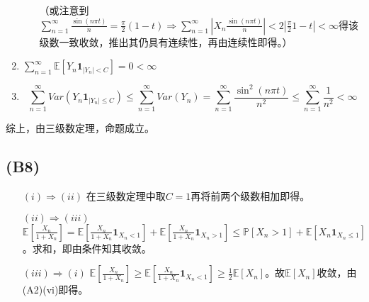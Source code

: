 \documentclass{ctexart}
\begin{document}
\begin{enumerate}
\begin{itemize}
  
  （或注意到$\sum\limits_{n=1}^{\infty}\frac{\sin(n\pi t)}{n}=\frac{\pi}{2}(1-t)\Rightarrow \sum\limits_{n=1}^{\infty}|X_{n}\frac{\sin(n\pi t)}{n}|<2|\frac{\pi}{2}{1-t}|<\infty$得该级数一致收敛，推出其仍具有连续性，再由连续性即得。）
\end{itemize}
\item $\sum_{n=1}^{\infty}\underset{}{\mathbb{E}}\left[ Y_n\mathbf{1}_{|Y_n|<C}\right] =0<\infty$
\item 
\begin{equation*}
\sum\limits_{n=1}^{\infty}Var(Y_n\mathbf{1}_{|Y_n|\leq C})\leq \sum\limits_{n=1}^{\infty}Var(Y_n)=\sum\limits_{n=1}^{\infty}\frac{\sin^2(n\pi t)}{n^2}\leq \sum\limits_{n=1}^{\infty}\frac{1}{n^2}<\infty
\end{equation*}

\end{enumerate}
综上，由三级数定理，命题成立。

\subsection{(B8)}
\begin{enumerate}
\item[$(i)\Rightarrow (ii)$] 在三级数定理中取$C=1$再将前两个级数相加即得。
\item[$(ii)\Rightarrow (iii)$]  $\underset{}{\mathbb{E}}\left[ \frac{X_n}{1+X_n}\right]=\underset{}{\mathbb{E}}\left[ \frac{X_n}{1+X_n}\mathbf{1}_{X_n<1}\right]+\underset{}{\mathbb{E}}\left[ \frac{X_n}{1+X_n}\mathbf{1}_{X_n>1}\right]\leq  \mathbb{P}\left[ X_n>1 \right]+\underset{}{\mathbb{E}}\left[ X_n\mathbf{1}_{X_n\leq 1}\right] $。求和，即由条件知其收敛。
\item[$(iii)\Rightarrow(i)$]  $\underset{}{\mathbb{E}}\left[ \frac{X_n}{1+X_n}\right]\geq \underset{}{\mathbb{E}}\left[ \frac{X_n}{1+X_n}\mathbf{1}_{X_n<1}\right]\geq \frac{1}{2}\underset{}{\mathbb{E}}\left[ X_n\right]$。故$\underset{}{\mathbb{E}}\left[ X_n\right] $收敛，由(A2)(vi)即得。
\end{enumerate}
\end{document}
